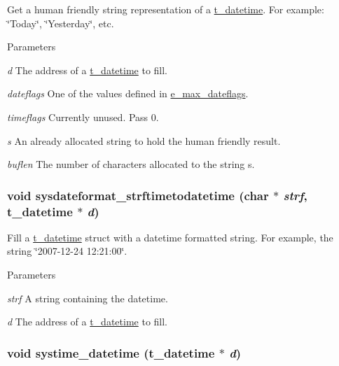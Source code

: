 Get a human friendly string representation of a \hyperlink{structt__datetime}{t\_\-datetime}. For example: \char`\"{}Today\char`\"{}, \char`\"{}Yesterday\char`\"{}, etc.


\begin{DoxyParams}{Parameters}
\item[{\em d}]The address of a \hyperlink{structt__datetime}{t\_\-datetime} to fill. \item[{\em dateflags}]One of the values defined in \hyperlink{group__systime_ga26a8d02aa000843530dcb2d350766951}{e\_\-max\_\-dateflags}. \item[{\em timeflags}]Currently unused. Pass 0. \item[{\em s}]An already allocated string to hold the human friendly result. \item[{\em buflen}]The number of characters allocated to the string s. \end{DoxyParams}
\hypertarget{group__systime_ga18e6eef81290f753a997dd6d0019ab60}{
\subsubsection[{sysdateformat\_\-strftimetodatetime}]{\setlength{\rightskip}{0pt plus 5cm}void sysdateformat\_\-strftimetodatetime (char $\ast$ {\em strf}, \/  {\bf t\_\-datetime} $\ast$ {\em d})}}
\label{group__systime_ga18e6eef81290f753a997dd6d0019ab60}


Fill a \hyperlink{structt__datetime}{t\_\-datetime} struct with a datetime formatted string. For example, the string \char`\"{}2007-\/12-\/24 12:21:00\char`\"{}.


\begin{DoxyParams}{Parameters}
\item[{\em strf}]A string containing the datetime. \item[{\em d}]The address of a \hyperlink{structt__datetime}{t\_\-datetime} to fill. \end{DoxyParams}
\hypertarget{group__systime_ga53bc85cf0868e8712f32ee846642ab83}{
\subsubsection[{systime\_\-datetime}]{\setlength{\rightskip}{0pt plus 5cm}void systime\_\-datetime ({\bf t\_\-datetime} $\ast$ {\em d})}}
\label{group__systime_ga53bc85cf0868e8712f32ee846642ab83}


